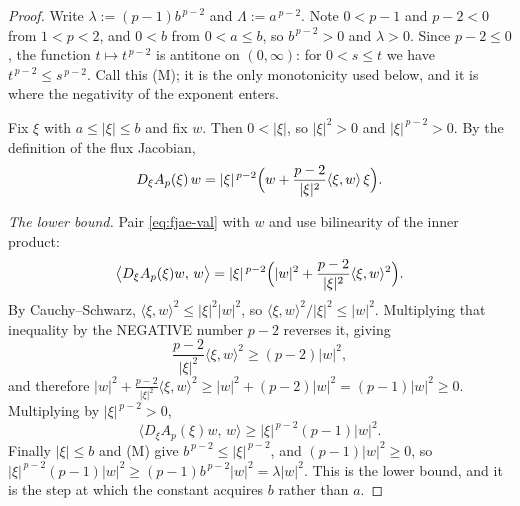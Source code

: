 \begin{proof}
Write $\lambda:=(p-1)b^{\,p-2}$ and $\Lambda:=a^{\,p-2}$.  Note $0<p-1$ and $p-2<0$ from
$1<p<2$, and $0<b$ from $0<a\le b$, so $b^{\,p-2}>0$ and $\lambda>0$.  Since $p-2\le0$, the
function $t\mapsto t^{\,p-2}$ is antitone on $(0,\infty)$: for $0<s\le t$ we have
$t^{\,p-2}\le s^{\,p-2}$.  Call this (M); it is the only monotonicity used below, and it is
where the negativity of the exponent enters.

Fix $\xi$ with $a\le\lvert\xi\rvert\le b$ and fix $w$.  Then $0<\lvert\xi\rvert$, so
$\lvert\xi\rvert^{2}>0$ and $\lvert\xi\rvert^{\,p-2}>0$.  By the definition of the flux Jacobian,
\begin{equation}\label{eq:fjae-val}
  D_\xi A_p(\xi)\,w
  =\lvert\xi\rvert^{\,p-2}\Bigl(w+\frac{p-2}{\lvert\xi\rvert^{2}}\langle\xi,w\rangle\,\xi\Bigr).
\end{equation}

\medskip\noindent\emph{The lower bound.}
Pair \eqref{eq:fjae-val} with $w$ and use bilinearity of the inner product:
\[
  \bigl\langle D_\xi A_p(\xi)w,\,w\bigr\rangle
  =\lvert\xi\rvert^{\,p-2}\Bigl(\lvert w\rvert^{2}
    +\frac{p-2}{\lvert\xi\rvert^{2}}\langle\xi,w\rangle^{2}\Bigr).
\]
By Cauchy--Schwarz, $\langle\xi,w\rangle^{2}\le\lvert\xi\rvert^{2}\lvert w\rvert^{2}$, so
$\langle\xi,w\rangle^{2}/\lvert\xi\rvert^{2}\le\lvert w\rvert^{2}$.  Multiplying that inequality
by the NEGATIVE number $p-2$ reverses it, giving
\[
  \frac{p-2}{\lvert\xi\rvert^{2}}\langle\xi,w\rangle^{2}\ge(p-2)\lvert w\rvert^{2},
\]
and therefore
$\lvert w\rvert^{2}+\frac{p-2}{\lvert\xi\rvert^{2}}\langle\xi,w\rangle^{2}
 \ge\lvert w\rvert^{2}+(p-2)\lvert w\rvert^{2}=(p-1)\lvert w\rvert^{2}\ge0$.
Multiplying by $\lvert\xi\rvert^{\,p-2}>0$,
\[
  \bigl\langle D_\xi A_p(\xi)w,\,w\bigr\rangle
  \ge\lvert\xi\rvert^{\,p-2}(p-1)\lvert w\rvert^{2}.
\]
Finally $\lvert\xi\rvert\le b$ and (M) give $b^{\,p-2}\le\lvert\xi\rvert^{\,p-2}$, and
$(p-1)\lvert w\rvert^{2}\ge0$, so
$\lvert\xi\rvert^{\,p-2}(p-1)\lvert w\rvert^{2}\ge(p-1)b^{\,p-2}\lvert w\rvert^{2}=\lambda\lvert
w\rvert^{2}$.  This is the lower bound, and it is the step at which the constant acquires $b$
rather than $a$.


\end{proof}
